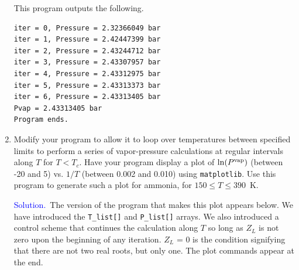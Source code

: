 \documentclass[11pt]{article}
\newif \ifshowsolutions
\begin{document}
\begin{enumerate}
This program outputs the following.
\begin{verbatim}
iter = 0, Pressure = 2.32366049 bar
iter = 1, Pressure = 2.42447399 bar
iter = 2, Pressure = 2.43244712 bar
iter = 3, Pressure = 2.43307957 bar
iter = 4, Pressure = 2.43312975 bar
iter = 5, Pressure = 2.43313373 bar
iter = 6, Pressure = 2.43313405 bar
Pvap = 2.43313405 bar
Program ends.
\end{verbatim}

\clearpage
\fi

\item Modify your program to allow it to loop over temperatures between specified limits to perform a series of vapor-pressure calculations at regular intervals along $T$ for $T<T_c$.  Have your program display a plot of $\ln(P^{\rm vap})$ (between -20 and 5) vs. $1/T$ (between 0.002 and 0.010) using {\tt matplotlib}.  Use this program to generate such a plot for ammonia, for $150 \le T \le 390$~K. 

\ifshowsolutions
\textcolor{blue}{Solution.}\ The version of the program that makes this plot appears below.  We have introduced the {\tt T\_list[]} and {\tt P\_list[]} arrays.  We also introduced a control scheme that continues the calculation along $T$ so long as $Z_L$ is not zero upon the beginning of any iteration. $Z_L$ = 0 is the condition signifying that there are not two real roots, but only one. The plot commands appear at the end.


\end{enumerate}
\end{document}
